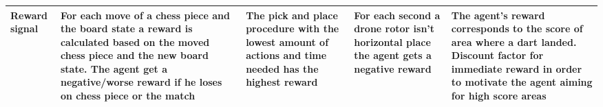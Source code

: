 \documentclass[a4paper]{article}
\begin{document}
\begin{tabularx}{\textwidth} { 
    		 >{\centering}X 
    		| >{\raggedright}X 
    		| >{\raggedright\arraybackslash}X
    		| >{\raggedright\arraybackslash}X 
    		| >{\raggedright\arraybackslash}X}
    	\hline
    	\vspace{2pt} \textbf{Reward} signal  & \vspace{2pt} For each move of a chess piece and the board state a reward is calculated based on the moved chess piece and the new board state. The agent get a negative/worse reward if he loses on chess piece or the match & \vspace{2pt} The pick and place procedure with the lowest amount of actions and time needed has the highest reward & \vspace{2pt} For each second a drone rotor isn't horizontal place the agent gets a negative reward & \vspace{2pt} The agent's reward corresponds to the score of area where a dart landed. Discount factor for immediate reward in order to motivate the agent aiming for high score areas \\
    	\hline
    \end{tabularx}
	\newpage
\end{document}
